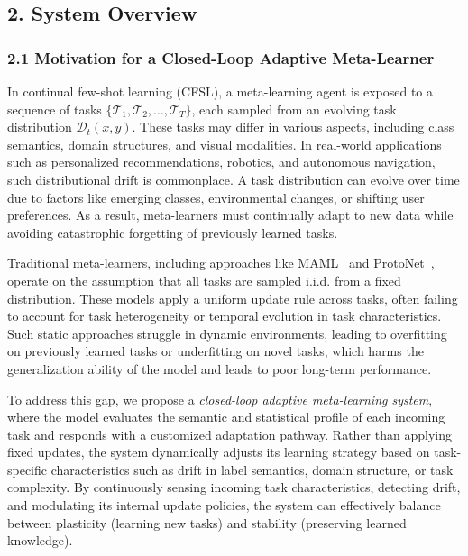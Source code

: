 \documentclass[conference]{IEEEtran}
\begin{document}
\subsection*{2. System Overview}

\subsubsection*{2.1 Motivation for a Closed-Loop Adaptive Meta-Learner}

In continual few-shot learning (CFSL), a meta-learning agent is exposed to a sequence of tasks $\{\mathcal{T}_1, \mathcal{T}_2, \dots, \mathcal{T}_T\}$, each sampled from an evolving task distribution $\mathcal{D}_t(x, y)$. These tasks may differ in various aspects, including class semantics, domain structures, and visual modalities. In real-world applications such as personalized recommendations, robotics, and autonomous navigation, such distributional drift is commonplace. A task distribution can evolve over time due to factors like emerging classes, environmental changes, or shifting user preferences. As a result, meta-learners must continually adapt to new data while avoiding catastrophic forgetting of previously learned tasks.

Traditional meta-learners, including approaches like MAML~\cite{finn2017maml} and ProtoNet~\cite{snell2017prototypical}, operate on the assumption that all tasks are sampled i.i.d. from a fixed distribution. These models apply a uniform update rule across tasks, often failing to account for task heterogeneity or temporal evolution in task characteristics. Such static approaches struggle in dynamic environments, leading to overfitting on previously learned tasks or underfitting on novel tasks, which harms the generalization ability of the model and leads to poor long-term performance.

To address this gap, we propose a \textit{closed-loop adaptive meta-learning system}, where the model evaluates the semantic and statistical profile of each incoming task and responds with a customized adaptation pathway. Rather than applying fixed updates, the system dynamically adjusts its learning strategy based on task-specific characteristics such as drift in label semantics, domain structure, or task complexity. By continuously sensing incoming task characteristics, detecting drift, and modulating its internal update policies, the system can effectively balance between plasticity (learning new tasks) and stability (preserving learned knowledge).
\end{document}
